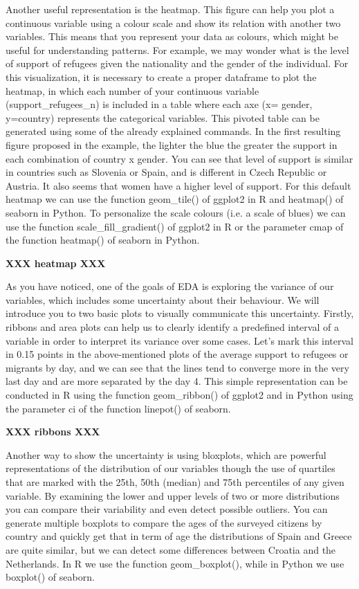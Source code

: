 Another useful representation is the heatmap. This figure can help you plot a continuous variable using a colour scale and show its relation with another two variables.  This means that you represent your data as colours, which might be useful for understanding patterns. For example, we may wonder what is the level of support of refugees given the nationality and the gender of the individual. For this visualization, it is necessary to create a proper dataframe to plot the heatmap, in which each number of your continuous variable (support\_refugees\_n) is included in a table where each axe (x= gender, y=country) represents the categorical variables. This pivoted table can be generated using some of the already explained commands.  In the first resulting figure proposed in the example, the lighter the blue the greater the support in each combination of country x gender. You can see that level of support is similar in countries such as Slovenia or Spain, and is different in Czech Republic or Austria. It also seems that women have a higher level of support. For this default heatmap we can use the function geom\_tile() of ggplot2 in R and heatmap() of seaborn in Python.  To personalize the scale colours (i.e. a scale of blues) we can use the function scale\_fill\_gradient() of ggplot2 in R or the parameter cmap of the function heatmap() of seaborn in Python. 

\textbf{XXX  heatmap  XXX}

As you have noticed, one of the goals of EDA is exploring the variance of our variables, which includes some uncertainty about their behaviour. We will introduce you to two basic plots to visually communicate this uncertainty. Firstly, ribbons and area plots can help us to clearly identify a predefined interval of a variable in order to interpret its variance over some cases. Let’s mark this interval in 0.15 points in the above-mentioned plots of the average support to refugees or migrants by day, and we can see that the lines tend to converge more in the very last day and are more separated by the day 4. This simple representation can be conducted in R using the function 	geom\_ribbon() of ggplot2 and in Python using the parameter ci of the function linepot() of seaborn.  

\textbf{XXX  ribbons  XXX}

Another way to show the uncertainty is using bloxplots, which are powerful representations of the distribution of our variables though the use of quartiles that are marked with the 25th, 50th (median) and 75th percentiles of any given variable. By examining the lower and upper levels of two or more distributions you can compare their variability and even detect possible outliers. You can generate multiple boxplots to compare the ages of the surveyed citizens by country and quickly get that in term of age the distributions of Spain and Greece are quite similar, but we can detect some differences between Croatia and the Netherlands. In R we use the function geom\_boxplot(), while in Python we use boxplot() of seaborn.

